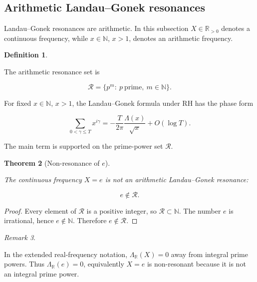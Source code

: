 \documentclass[11pt]{amsart}
\numberwithin{equation}{section}
\theoremstyle{plain}
\newtheorem{theorem}{Theorem}[section]
\theoremstyle{definition}
\newtheorem{definition}[theorem]{Definition}
\theoremstyle{remark}
\newtheorem{remark}[theorem]{Remark}
\begin{document}
\subsection{Arithmetic Landau--Gonek resonances}
\label{subsec:arithmetic_landau_gonek_resonances}

Landau--Gonek resonances are arithmetic. In this subsection
\(X\in\mathbb{R}_{>0}\) denotes a continuous frequency, while
\(x\in\mathbb{N}\), \(x>1\), denotes an arithmetic frequency.

\begin{definition}
\label{def:prime_power_resonance_set}

The arithmetic resonance set is

\begin{equation}
\mathcal R
=
\{p^m:\ p\ \text{prime},\ m\in\mathbb N\}.
\label{eq:prime_power_resonance_set}
\end{equation}

\end{definition}

For fixed \(x\in\mathbb N\), \(x>1\), the Landau--Gonek formula under RH
has the phase form

\begin{equation}
\sum_{0<\gamma\leq T}x^{i\gamma}
=
-
\frac{T}{2\pi}
\frac{\Lambda(x)}{\sqrt{x}}
+
O(\log T).
\label{eq:landau_gonek_new_section_phase_form}
\end{equation}

The main term is supported on the prime-power set \(\mathcal R\).

\begin{theorem}[Non-resonance of \(e\)]
\label{thm:e_non_resonant}

The continuous frequency \(X=e\) is not an arithmetic Landau--Gonek
resonance:

\begin{equation}
e\notin\mathcal R.
\label{eq:e_not_in_resonance_set}
\end{equation}

\end{theorem}

\begin{proof}
Every element of \(\mathcal R\) is a positive integer, so
\(\mathcal R\subset\mathbb N\). The number \(e\) is irrational, hence
\(e\notin\mathbb N\). Therefore \(e\notin\mathcal R\).
\end{proof}

\begin{remark}
\label{rem:no_mangoldt_at_e}

In the extended real-frequency notation,
\(\Lambda_{\mathbb R}(X)=0\) away from integral prime powers. Thus
\(\Lambda_{\mathbb R}(e)=0\), equivalently \(X=e\) is non-resonant
because it is not an integral prime power.
\end{remark}
\end{document}
